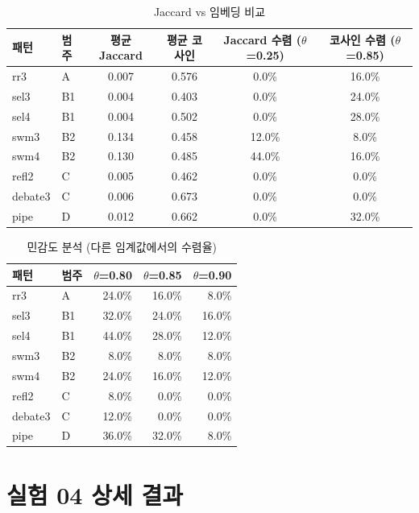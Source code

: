 \documentclass[a4paper,11pt]{article}
\begin{document}
\begin{table}[H]
\centering
\caption{Jaccard vs 임베딩 비교}
\label{tab:jaccard-vs-embedding}
{\footnotesize
\begin{tabular}{llcccc}
\toprule
패턴 & 범주 & 평균 Jaccard & 평균 코사인 & Jaccard 수렴 ($\theta$=0.25) & 코사인 수렴 ($\theta$=0.85) \\
\midrule
rr3     & A  & 0.007 & 0.576 & 0.0\%  & 16.0\% \\
sel3    & B1 & 0.004 & 0.403 & 0.0\%  & 24.0\% \\
sel4    & B1 & 0.004 & 0.502 & 0.0\%  & 28.0\% \\
swm3    & B2 & 0.134 & 0.458 & 12.0\% & 8.0\%  \\
swm4    & B2 & 0.130 & 0.485 & 44.0\% & 16.0\% \\
refl2   & C  & 0.005 & 0.462 & 0.0\%  & 0.0\%  \\
debate3 & C  & 0.006 & 0.673 & 0.0\%  & 0.0\%  \\
pipe    & D  & 0.012 & 0.662 & 0.0\%  & 32.0\% \\
\bottomrule
\end{tabular}
}
\end{table}

\begin{table}[H]
\centering
\caption{민감도 분석 (다른 임계값에서의 수렴율)}
\label{tab:sensitivity-theta}
{\small
\begin{tabular}{llrrr}
\toprule
패턴 & 범주 & $\theta$=0.80 & $\theta$=0.85 & $\theta$=0.90 \\
\midrule
rr3     & A  & 24.0\% & 16.0\% & 8.0\% \\
sel3    & B1 & 32.0\% & 24.0\% & 16.0\% \\
sel4    & B1 & 44.0\% & 28.0\% & 12.0\% \\
swm3    & B2 & 8.0\%  & 8.0\%  & 8.0\% \\
swm4    & B2 & 24.0\% & 16.0\% & 12.0\% \\
refl2   & C  & 8.0\%  & 0.0\%  & 0.0\% \\
debate3 & C  & 12.0\% & 0.0\%  & 0.0\% \\
pipe    & D  & 36.0\% & 32.0\% & 8.0\% \\
\bottomrule
\end{tabular}
}
\end{table}

\section{실험 04 상세 결과}
\label{app:exp04-details}
\end{document}
